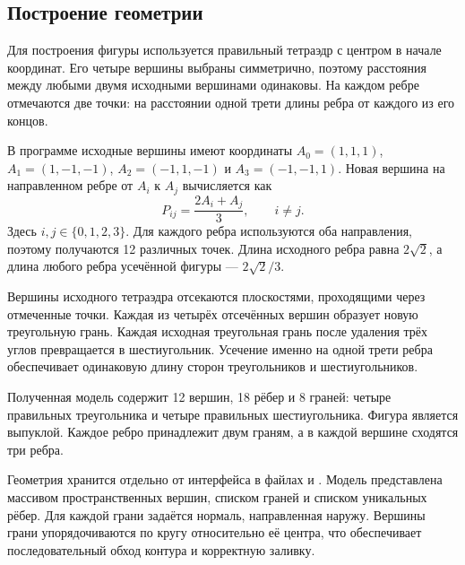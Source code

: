\subsection{Построение геометрии}

Для построения фигуры используется правильный тетраэдр с центром в начале координат. Его четыре вершины выбраны симметрично, поэтому расстояния между любыми двумя исходными вершинами одинаковы. На каждом ребре отмечаются две точки: на расстоянии одной трети длины ребра от каждого из его концов.

В программе исходные вершины имеют координаты
\(A_0=(1,1,1)\), \(A_1=(1,-1,-1)\),
\(A_2=(-1,1,-1)\) и \(A_3=(-1,-1,1)\).
Новая вершина на направленном ребре от \(A_i\) к \(A_j\) вычисляется как
\begin{equation}
  P_{ij}=\frac{2A_i+A_j}{3}, \qquad i\ne j.
  \label{eq:truncation}
\end{equation}
Здесь \(i,j\in\{0,1,2,3\}\). Для каждого ребра используются оба направления,
поэтому получаются 12 различных точек. Длина исходного ребра равна
\(2\sqrt{2}\), а длина любого ребра усечённой фигуры — \(2\sqrt{2}/3\).

Вершины исходного тетраэдра отсекаются плоскостями, проходящими через отмеченные точки. Каждая из четырёх отсечённых вершин образует новую треугольную грань. Каждая исходная треугольная грань после удаления трёх углов превращается в шестиугольник. Усечение именно на одной трети ребра обеспечивает одинаковую длину сторон треугольников и шестиугольников.

Полученная модель содержит 12 вершин, 18 рёбер и 8 граней: четыре правильных треугольника и четыре правильных шестиугольника. Фигура является выпуклой. Каждое ребро принадлежит двум граням, а в каждой вершине сходятся три ребра.

Геометрия хранится отдельно от интерфейса в файлах  и . Модель представлена массивом пространственных вершин, списком граней и списком уникальных рёбер. Для каждой грани задаётся нормаль, направленная наружу. Вершины грани упорядочиваются по кругу относительно её центра, что обеспечивает последовательный обход контура и корректную заливку.
